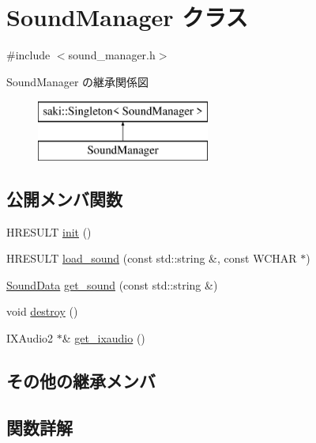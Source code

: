 \hypertarget{class_sound_manager}{}\section{Sound\+Manager クラス}
\label{class_sound_manager}


{\ttfamily \#include $<$sound\+\_\+manager.\+h$>$}

Sound\+Manager の継承関係図\begin{figure}[H]
\begin{center}
\leavevmode
\includegraphics[height=2.000000cm]{class_sound_manager}
\end{center}
\end{figure}
\subsection*{公開メンバ関数}
\begin{DoxyCompactItemize}
\item 
H\+R\+E\+S\+U\+LT \mbox{\hyperlink{class_sound_manager_abbebeb61e63a5ec91e8d3081759cf598}{init}} ()
\item 
H\+R\+E\+S\+U\+LT \mbox{\hyperlink{class_sound_manager_a0a2e4248f9ca4654d672342750b73fb3}{load\+\_\+sound}} (const std\+::string \&, const W\+C\+H\+AR $\ast$)
\item 
\mbox{\hyperlink{struct_sound_data}{Sound\+Data}} \mbox{\hyperlink{class_sound_manager_a71867920306703ef2f3e5331cda3c4de}{get\+\_\+sound}} (const std\+::string \&)
\item 
void \mbox{\hyperlink{class_sound_manager_aeb159a5b4e20a7bb5da4d4377b30f5cc}{destroy}} ()
\item 
I\+X\+Audio2 $\ast$\& \mbox{\hyperlink{class_sound_manager_acf958b3ac76bea62fca0d4c9df8028b6}{get\+\_\+ixaudio}} ()
\end{DoxyCompactItemize}
\subsection*{その他の継承メンバ}


\subsection{関数詳解}
\mbox{\label{class_sound_manager_aeb159a5b4e20a7bb5da4d4377b30f5cc}} 
